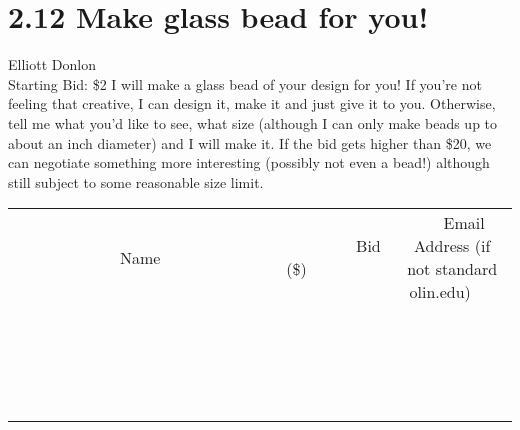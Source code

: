 \documentclass[11pt]{article}
\begin{document}
\section*{2.12 Make glass bead for you!}
Elliott Donlon
\\
Starting Bid: \$2
\newline
I will make a glass bead of your design for you! If you're not feeling that creative, I can design it, make it and just give it to you. Otherwise, tell me what you'd like to see, what size (although I can only make beads up to about an inch diameter) and I will make it. If the bid gets higher than \$20, we can negotiate something more interesting (possibly not even a bead!) although still subject to some reasonable size limit.
\\[3ex]
\begin{tabular}{c c c}
~~~~~~~~~~~~~Name~~~~~~~~~~~~~ & ~~~~~~~~~Bid (\$)~~~~~~~~~  & ~~~Email Address (if not standard olin.edu)~~~\\
 & & \\
\hline
 & & \\
\hline
 & & \\
\hline
 & & \\
\hline
 & & \\
\hline
 & & \\
\hline
 & & \\
\hline
 & & \\
\hline
 & & \\
\hline
 & & \\
\hline
 & & \\
\hline
 & & \\
\hline
 & & \\
\hline
 & & \\
\hline
 & & \\
\hline
 & & \\
\hline
 & & \\
\hline
 & & \\
\hline
 & & \\
\hline
\end{tabular}
\newpage
\end{document}
